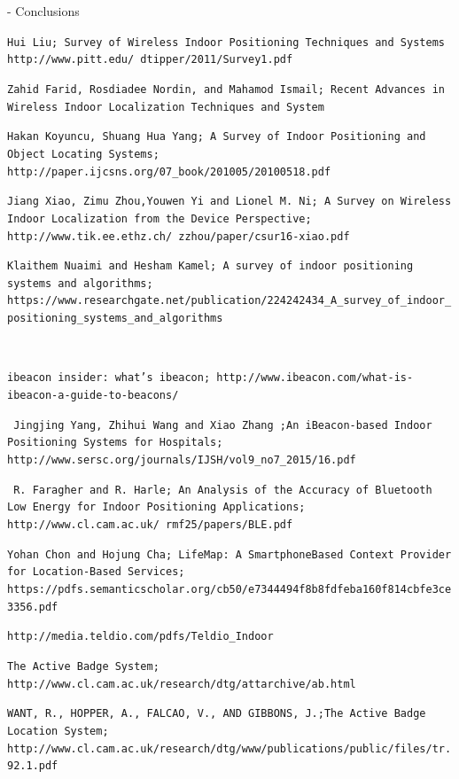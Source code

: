 \documentclass[a4paper]{IEEEtran}
\begin{document}
- Conclusions




\begin{thebibliography}{9}
 \texttt{Hui Liu; Survey of Wireless Indoor Positioning Techniques and Systems http://www.pitt.edu/~dtipper/2011/Survey1.pdf} 

 \texttt{Zahid Farid, Rosdiadee Nordin, and Mahamod Ismail; Recent Advances in Wireless Indoor Localization Techniques and System}

 \texttt{Hakan Koyuncu, Shuang Hua Yang; A Survey of Indoor Positioning and Object Locating Systems; http://paper.ijcsns.org/07_book/201005/20100518.pdf}

 \texttt{Jiang Xiao, Zimu Zhou,Youwen Yi and Lionel M. Ni; A Survey on Wireless Indoor Localization from the Device Perspective; http://www.tik.ee.ethz.ch/~zzhou/paper/csur16-xiao.pdf}

\texttt{Klaithem Nuaimi and Hesham Kamel; A survey of indoor positioning systems and algorithms; https://www.researchgate.net/publication/224242434_A_survey_of_indoor_positioning_systems_and_algorithms}

\texttt{ }

\texttt{ibeacon insider: what's ibeacon; http://www.ibeacon.com/what-is-ibeacon-a-guide-to-beacons/}

\texttt{ Jingjing Yang, Zhihui Wang and Xiao Zhang ;An iBeacon-based Indoor Positioning Systems for Hospitals; http://www.sersc.org/journals/IJSH/vol9_no7_2015/16.pdf}

\texttt{ R. Faragher and R. Harle; An Analysis of the Accuracy of Bluetooth Low Energy for Indoor Positioning Applications; http://www.cl.cam.ac.uk/~rmf25/papers/BLE.pdf}

\texttt{Yohan Chon and Hojung Cha; LifeMap: A SmartphoneBased Context Provider for Location-Based Services; https://pdfs.semanticscholar.org/cb50/e7344494f8b8fdfeba160f814cbfe3ce3356.pdf}

\texttt{http://media.teldio.com/pdfs/Teldio_Indoor}

\texttt{The Active Badge System; http://www.cl.cam.ac.uk/research/dtg/attarchive/ab.html}

\texttt{WANT, R., HOPPER, A., FALCAO, V., AND GIBBONS, J.;The Active Badge Location System;  http://www.cl.cam.ac.uk/research/dtg/www/publications/public/files/tr.92.1.pdf}


\end{thebibliography}
\end{document}
